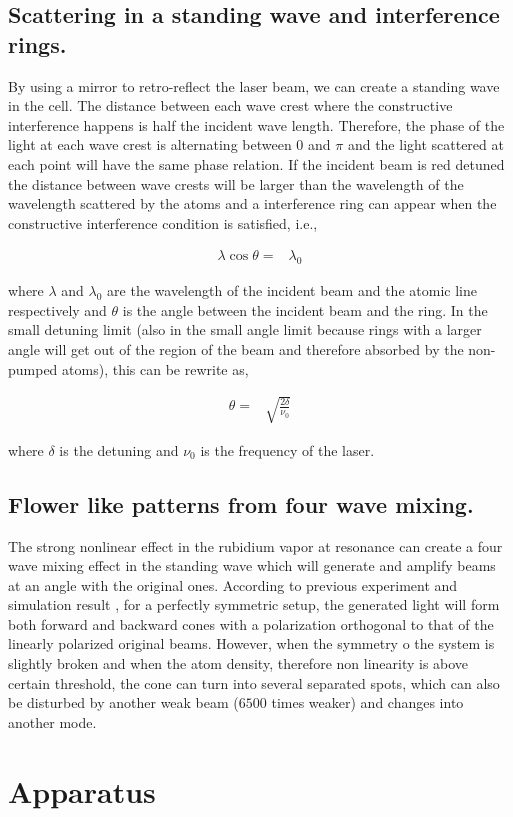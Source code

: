 \documentclass[aps,twocolumn,secnumarabic,balancelastpage,amsmath,amssymb,nofootinbib]{revtex4}
\newcommand{\eqar}[1]
{
  \begin{align*}
    #1
  \end{align*}
}
\begin{document}
\subsection{Scattering in a standing wave and interference rings.}
By using a mirror to retro-reflect the laser beam, we can create a standing wave in the cell. The distance between each wave crest where the constructive interference happens is half the incident wave length. Therefore, the phase of the light at each wave crest is alternating between $0$ and $\pi$ and the light scattered at each point will have the same phase relation. If the incident beam is red detuned the distance between wave crests will be larger than the wavelength of the wavelength scattered by the atoms and a interference ring can appear when the constructive interference condition is satisfied, i.e.,
\eqar{
  \lambda\cos\theta=&\lambda_0
}
where $\lambda$ and $\lambda_0$ are the wavelength of the incident beam and the atomic line respectively and $\theta$ is the angle between the incident beam and the ring. In the small detuning limit (also in the small angle limit because rings with a larger angle will get out of the region of the beam and therefore absorbed by the non-pumped atoms), this can be rewrite as,
\eqar{
  \theta=&\sqrt{\frac{2\delta}{\nu_0}}
}
where $\delta$ is the detuning and $\nu_0$ is the frequency of the laser.

\subsection{Flower like patterns from four wave mixing.}
The strong nonlinear effect in the rubidium vapor at resonance can create a four wave mixing effect in the standing wave which will generate and amplify beams at an angle with the original ones. According to previous experiment and simulation result \cite{rb_exp, rb_sim, rb_switch}, for a perfectly symmetric setup, the generated light will form both forward and backward cones with a polarization orthogonal to that of the linearly polarized original beams. However, when the symmetry o the system is slightly broken and when the atom density, therefore non linearity is above certain threshold, the cone can turn into several separated spots, which can also be disturbed by another weak beam ($6500$ times weaker\cite{rb_switch}) and changes into another mode.

\section{Apparatus}
\end{document}
